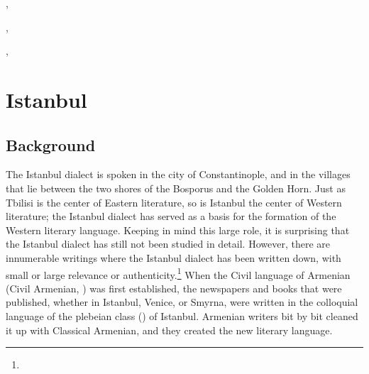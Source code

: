 ,




,


,






\chapter{Istanbul}\label{chapter:istanbul}
\section{Background}

\begin{adjarianpage}\label{page:249}\end{adjarianpage}%

The Istanbul dialect is spoken in the city of Constantinople, and in the villages that lie between the two shores of the Bosporus and the Golden Horn. Just as Tbilisi is the center of Eastern literature, so is Istanbul the center of Western literature; the Istanbul dialect has served as a basis for the formation of the Western literary language. Keeping in mind this large role, it is surprising that the Istanbul dialect has still not been studied in detail. However, there are innumerable writings where the Istanbul dialect has been written down, with small or large relevance or authenticity.\footnote{} When the Civil language of Armenian (Civil Armenian, ) was first established, the newspapers and books that were published, whether in Istanbul, Venice, or Smyrna, were written in the colloquial language of the plebeian class () of Istanbul. Armenian writers bit by bit cleaned it up with Classical Armenian, and they created the new literary language. 

